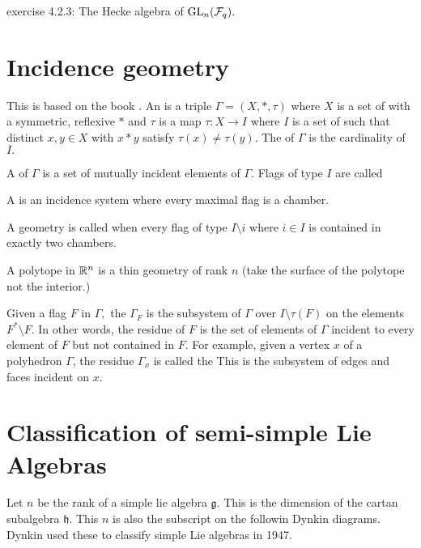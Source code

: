 \documentclass[12pt]{article}
\begin{document}
\cite{Kassel2010}
exercise 4.2.3: The Hecke algebra of $\mathrm{GL}_n(\mathcal{F}_q).$

%
%

\section{Incidence geometry}

This is based on the book \cite{Buekenhout2013}.
An  is a triple 
$\Gamma=(X,*,\tau)$ where $X$ is a set of 
with a symmetric, reflexive  $*$
and $\tau$ is a map $\tau:X\to I$ where $I$ is a set of 
such that distinct $x,y\in X$ with $x*y$ satisfy $\tau(x)\ne\tau(y).$
The  of $\Gamma$ is the cardinality of $I.$

A  of $\Gamma$ is a set of mutually incident
elements of $\Gamma.$
Flags of type $I$ are called 

A  is an incidence system where every
maximal flag is a chamber.

A geometry is called  when every
flag of type $I\setminus {i}$ where $i\in I$
is contained in exactly two chambers.

A polytope in $\mathbb{R}^n$ is a thin geometry of rank $n$
(take the surface of the polytope not the interior.)

Given a flag $F$ in $\Gamma,$
the  $\Gamma_F$ is the 
subsystem of $\Gamma$ over $I\setminus \tau(F) $
on the elements $F^{*}\setminus F.$
In other words, the residue of $F$ is the set of
elements of $\Gamma$ incident to every element of $F$
but not contained in $F.$
For example, given a vertex $x$ of a polyhedron $\Gamma$, the
residue $\Gamma_x$ is called the  
This is the subsystem of edges and faces incident on $x.$

% 


\section{Classification of semi-simple Lie Algebras}

Let $n$ be the rank of a simple lie algebra $\mathfrak{g}.$
This is the dimension of the cartan subalgebra $\mathfrak{h}.$
This $n$ is also the subscript on the followin Dynkin diagrams. 
Dynkin used these to classify simple Lie algebras in 1947.
\end{document}
